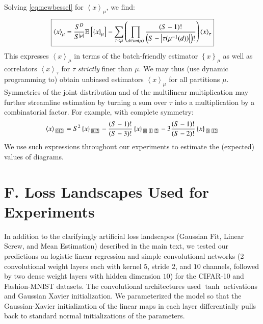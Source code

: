 \documentclass{article}
\newcommand{\expct}[1]{\mathbb{E}\left[#1\right]}
\newcommand{\wrap}[1]{\left(#1\right)}
\newcommand{\wang}[1]{\left\langle#1\right\rangle}
\newcommand{\wabs}[1]{\left|#1\right|}
\newcommand{\wurl}[1]{\left\{#1\right\}}
\newcommand{\partbox}[1]{
    \text{
        \fboxsep=0.5pt
        \tiny
        \fbox{#1}
    }
}
\begin{document}
    Solving \ref{eq:newbessel} for $\wang{x}_\mu$, we find:
    \begin{equation*}
        \text{\fbox{$
        \wang{x}_\mu
        =
        \frac{S^D}{S^{\wabs{\mu}}}
        \expct{
            \wurl{x}_\mu
        }
        -
        \sum_{\tau < \mu} \wrap{
            \prod_{d\in im(\mu)}
            \frac{\wrap{S-1}!}{\wrap{S-\wabs{\tau(\mu^{-1}(d))}}!}
        }
        \wang{x}_\tau
        $}}
    \end{equation*}
    This expresses $\wang{x}_\mu$ in terms of the batch-friendly estimator
    $\wurl{x}_\mu$ as well as correlators $\wang{x}_\tau$ for $\tau$ 
    \emph{strictly} finer than $\mu$.  We may thus (use dynamic programming to)
    obtain unbiased estimators $\wang{x}_\mu$ for all partitions $\mu$. 
    Symmetries of the joint distribution and of the multilinear multiplication
    may further streamline estimation by turning a sum over $\tau$ into a
    multiplication by a combinatorial factor.  For example, with complete
    symmetry:
    $$
        \wang{x}_{\partbox{012}}
        =
        S^2
        \wurl{x}_{\partbox{012}}
        -
        \frac{(S-1)!}{(S-3)!}
        \wurl{x}_{\partbox{0}\partbox{1}\partbox{2}}
        -
        3\frac{(S-1)!}{(S-2)!}
        \wurl{x}_{\partbox{0}\partbox{12}}
    $$
    We use such expressions throughout our experiments to estimate the
    (expected) values of diagrams.

\section*{F. Loss Landscapes Used for Experiments}
    In addition to the clarifyingly artificial loss landscapes (Gaussian Fit,
    Linear Screw, and Mean Estimation) described in the main text, we tested
    our predictions on logistic linear regression and simple convolutional
    networks (2 convolutional weight layers each with kernel $5$, stride $2$,
    and $10$ channels, followed by two dense weight layers with hidden
    dimension $10$) for the CIFAR-10 and Fashion-MNIST datasets.  The
    convolutional architectures used $\tanh$ activations and Gaussian Xavier
    initialization.  We parameterized the model so that the Gaussian-Xavier
    initialization of the linear maps in each layer differentially pulls back
    to standard normal initializations of the parameters.
    
\end{document}
